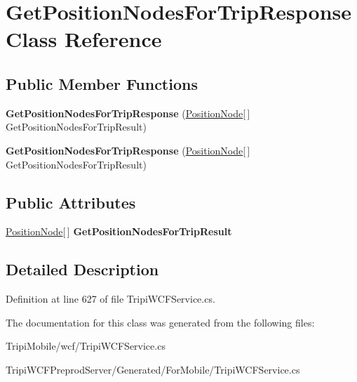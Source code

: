 \hypertarget{class_get_position_nodes_for_trip_response}{
\section{GetPositionNodesForTripResponse Class Reference}
\label{class_get_position_nodes_for_trip_response}
}
\subsection*{Public Member Functions}
\begin{DoxyCompactItemize}
\item 
\hypertarget{class_get_position_nodes_for_trip_response_abfdebc0b49cd0872c7f426cc8d975064}{
{\bfseries GetPositionNodesForTripResponse} (\hyperlink{class_position_node}{PositionNode}\mbox{[}$\,$\mbox{]} GetPositionNodesForTripResult)}
\label{class_get_position_nodes_for_trip_response_abfdebc0b49cd0872c7f426cc8d975064}

\item 
\hypertarget{class_get_position_nodes_for_trip_response_abfdebc0b49cd0872c7f426cc8d975064}{
{\bfseries GetPositionNodesForTripResponse} (\hyperlink{class_position_node}{PositionNode}\mbox{[}$\,$\mbox{]} GetPositionNodesForTripResult)}
\label{class_get_position_nodes_for_trip_response_abfdebc0b49cd0872c7f426cc8d975064}

\end{DoxyCompactItemize}
\subsection*{Public Attributes}
\begin{DoxyCompactItemize}
\item 
\hypertarget{class_get_position_nodes_for_trip_response_ab9b3742d0b25118e56884ca030205e03}{
\hyperlink{class_position_node}{PositionNode}\mbox{[}$\,$\mbox{]} {\bfseries GetPositionNodesForTripResult}}
\label{class_get_position_nodes_for_trip_response_ab9b3742d0b25118e56884ca030205e03}

\end{DoxyCompactItemize}


\subsection{Detailed Description}


Definition at line 627 of file TripiWCFService.cs.

The documentation for this class was generated from the following files:\begin{DoxyCompactItemize}
\item 
TripiMobile/wcf/TripiWCFService.cs\item 
TripiWCFPreprodServer/Generated/ForMobile/TripiWCFService.cs\end{DoxyCompactItemize}

